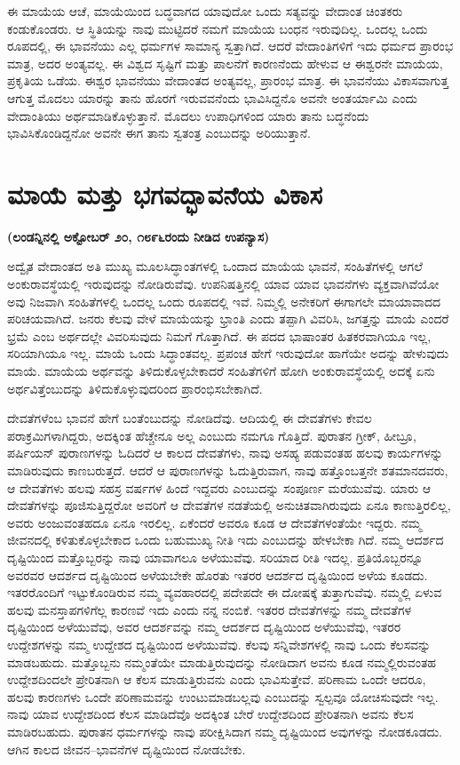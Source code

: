 ಈ ಮಾಯೆಯ ಆಚೆ, ಮಾಯೆಯಿಂದ ಬದ್ಧವಾಗದ ಯಾವುದೋ ಒಂದು ಸತ್ಯವನ್ನು ವೇದಾಂತ ಚಿಂತಕರು ಕಂಡುಕೊಂಡರು. ಆ ಸ್ಥಿತಿಯನ್ನು ನಾವು ಮುಟ್ಟಿದರೆ ನಮಗೆ ಮಾಯೆಯ ಬಂಧನ ಇರುವುದಿಲ್ಲ. ಒಂದಲ್ಲ ಒಂದು ರೂಪದಲ್ಲಿ, ಈ ಭಾವನೆಯು ಎಲ್ಲ ಧರ್ಮಗಳ ಸಾಮಾನ್ಯ ಸ್ವತ್ತಾಗಿದೆ. ಆದರೆ ವೇದಾಂತಿಗಳಿಗೆ ಇದು ಧರ್ಮದ ಪ್ರಾರಂಭ ಮಾತ್ರ, ಅದರ ಅಂತ್ಯವಲ್ಲ. ಈ ವಿಶ್ವದ ಸೃಷ್ಟಿಗೆ ಮತ್ತು ಪಾಲನೆಗೆ ಕಾರಣನೆಂದು ಹೇಳುವ ಆ ಈಶ್ವರನೇ ಮಾಯೆಯ, ಪ್ರಕೃತಿಯ ಒಡೆಯ. ಈಶ್ವರ ಭಾವನೆಯು ವೇದಾಂತದ ಅಂತ್ಯವಲ್ಲ, ಪ್ರಾರಂಭ ಮಾತ್ರ. ಈ ಭಾವನೆಯು ವಿಕಾಸವಾಗುತ್ತ ಆಗುತ್ತ ಮೊದಲು ಯಾರನ್ನು ತಾನು ಹೊರಗೆ ಇರುವವನೆಂದು ಭಾವಿಸಿದ್ದನೊ ಅವನೇ ಅಂತರ್ಯಾಮಿ ಎಂದು ವೇದಾಂತಿಯು ಅರ್ಥಮಾಡಿಕೊಳ್ಳುತ್ತಾನೆ. ಮೊದಲು ಉಪಾಧಿಗಳಿಂದ ಯಾರು ತಾನು ಬದ್ಧನೆಂದು ಭಾವಿಸಿಕೊಂಡಿದ್ದನೋ ಅವನೇ ಈಗ ತಾನು ಸ್ವತಂತ್ರ ಎಂಬುದನ್ನು ಅರಿಯುತ್ತಾನೆ.

\chapter{ಮಾಯೆ ಮತ್ತು ಭಗವದ್ಭಾವನೆಯ ವಿಕಾಸ}

\centerline{\textbf{(ಲಂಡನ್ನಿನಲ್ಲಿ ಅಕ್ಟೋಬರ್​ ೨೦, ೧೮೯೬ರಂದು ನೀಡಿದ ಉಪನ್ಯಾಸ)}}

ಅದ್ವೈತ ವೇದಾಂತದ ಅತಿ ಮುಖ್ಯ ಮೂಲಸಿದ್ಧಾಂತಗಳಲ್ಲಿ ಒಂದಾದ ಮಾಯೆಯ ಭಾವನೆ, ಸಂಹಿತೆಗಳಲ್ಲಿ ಆಗಲೆ ಅಂಕುರಾವಸ್ಥೆಯಲ್ಲಿ ಇರುವುದನ್ನು ನೋಡಿರುವೆವು. ಉಪನಿಷತ್ತಿನಲ್ಲಿ ಯಾವ ಯಾವ ಭಾವನೆಗಳು ವ್ಯಕ್ತವಾಗಿವೆಯೋ ಅವು ನಿಜವಾಗಿ ಸಂಹಿತೆಗಳಲ್ಲಿ ಒಂದಲ್ಲ ಒಂದು ರೂಪದಲ್ಲಿ ಇವೆ. ನಿಮ್ಮಲ್ಲಿ ಅನೇಕರಿಗೆ ಈಗಾಗಲೇ ಮಾಯಾವಾದದ ಪರಿಚಯವಾಗಿದೆ. ಜನರು ಕೆಲವು ವೇಳೆ ಮಾಯೆಯನ್ನು ಭ್ರಾಂತಿ ಎಂದು ತಪ್ಪಾಗಿ ವಿವರಿಸಿ, ಜಗತ್ತನ್ನು ಮಾಯೆ ಎಂದರೆ ಭ್ರಮೆ ಎಂಬ ಅರ್ಥದಲ್ಲೇ ವಿವರಿಸುವುದು ನಿಮಗೆ ಗೊತ್ತಾಗಿದೆ. ಈ ಪದದ ಭಾಷಾಂತರ ಹಿತಕರವಾಗಿಯೂ ಇಲ್ಲ, ಸರಿಯಾಗಿಯೂ ಇಲ್ಲ. ಮಾಯೆ ಒಂದು ಸಿದ್ಧಾಂತವಲ್ಲ. ಪ್ರಪಂಚ ಹೇಗೆ ಇರುವುದೋ ಹಾಗೆಯೇ ಅದನ್ನು ಹೇಳುವುದು ಮಾಯೆ. ಮಾಯೆಯ ಅರ್ಥವನ್ನು ತಿಳಿದುಕೊಳ್ಳಬೇಕಾದರೆ ಸಂಹಿತೆಗಳಿಗೆ ಹೋಗಿ ಅಂಕುರಾವಸ್ಥೆಯಲ್ಲಿ ಅದಕ್ಕೆ ಏನು ಅರ್ಥವಿತ್ತೆಂಬುದನ್ನು ತಿಳಿದುಕೊಳ್ಳುವುದರಿಂದ ಪ್ರಾರಂಭಿಸಬೇಕಾಗಿದೆ.

ದೇವತೆಗಳೆಂಬ ಭಾವನೆ ಹೇಗೆ ಬಂತೆಂಬುದನ್ನು ನೋಡಿದೆವು. ಆದಿಯಲ್ಲಿ ಈ ದೇವತೆಗಳು ಕೇವಲ ಪರಾಕ್ರಮಿಗಳಾಗಿದ್ದರು, ಅದಕ್ಕಿಂತ ಹೆಚ್ಚೇನೂ ಅಲ್ಲ ಎಂಬುದು ನಮಗೂ ಗೊತ್ತಿದೆ. ಪುರಾತನ ಗ್ರೀಕ್​, ಹೀಬ್ರೂ, ಪರ್ಷಿಯನ್​ ಪುರಾಣಗಳನ್ನು ಓದಿದರೆ ಆ ಕಾಲದ ದೇವತೆಗಳು, ನಾವು ಅಸಹ್ಯ ಪಡುವಂತಹ ಹಲವು ಕಾರ್ಯಗಳನ್ನು ಮಾಡಿರುವುದು ಕಾಣಬರುತ್ತದೆ. ಆದರೆ ಆ ಪುರಾಣಗಳನ್ನು ಓದುತ್ತಿರುವಾಗ, ನಾವು ಹತ್ತೊಂಬತ್ತನೇ ಶತಮಾನದವರು, ಆ ದೇವತೆಗಳು ಹಲವು ಸಹಸ್ರ ವರ್ಷಗಳ ಹಿಂದೆ ಇದ್ದವರು ಎಂಬುದನ್ನು ಸಂಪೂರ್ಣ ಮರೆಯುವೆವು. ಯಾರು ಆ ದೇವತೆಗಳನ್ನು ಪೂಜಿಸುತ್ತಿದ್ದರೋ ಅವರಿಗೆ ಆ ದೇವತೆಗಳ ನಡತೆಯಲ್ಲಿ ಅನುಚಿತವಾಗಿರುವುದು ಏನೂ ಕಾಣುತ್ತಿರಲಿಲ್ಲ, ಅವರು ಅಂಜುವಂತಹದೂ ಏನೂ ಇರಲಿಲ್ಲ. ಏಕೆಂದರೆ ಅವರೂ ಕೂಡ ಆ ದೇವತೆಗಳಂತೆಯೇ ಇದ್ದರು. ನಮ್ಮ ಜೀವನದಲ್ಲಿ ಕಳಿತುಕೊಳ್ಳಬೇಕಾದ ಒಂದು ಬಹುಮುಖ್ಯ ನೀತಿ ಇದು ಎಂಬುದನ್ನು ಹೇಳಬೇಕಾ ಗಿದೆ. ನಮ್ಮ ಆದರ್ಶದ ದೃಷ್ಟಿಯಿಂದ ಮತ್ತೊಬ್ಬರನ್ನು ನಾವು ಯಾವಾಗಲೂ ಅಳೆಯುವೆವು. ಸರಿಯಾದ ರೀತಿ ಇದಲ್ಲ. ಪ್ರತಿಯೊಬ್ಬರನ್ನೂ ಅವರವರ ಆದರ್ಶದ ದೃಷ್ಟಿಯಿಂದ ಅಳೆಯಬೇಕೇ ಹೊರತು ಇತರರ ಆದರ್ಶದ ದೃಷ್ಟಿಯಿಂದ ಅಳೆಯ ಕೂಡದು. ಇತರರೊಂದಿಗೆ ಇಟ್ಟುಕೊಂಡಿರುವ ನಮ್ಮ ವ್ಯವಹಾರದಲ್ಲಿ ಪದೇಪದೇ ಈ ದೋಷಕ್ಕೆ ತುತ್ತಾಗುವೆವು. ನಮ್ಮಲ್ಲಿ ಏಳುವ ಹಲವು ಮನಸ್ತಾಪಗಳಿಗೆಲ್ಲ ಕಾರಣವೆ ಇದು ಎಂದು ನನ್ನ ನಂಬಿಕೆ. ಇತರರ ದೇವತೆಗಳನ್ನು ನಮ್ಮ ದೇವತೆಗಳ ದೃಷ್ಟಿಯಿಂದ ಅಳೆಯುವೆವು, ಅವರ ಆದರ್ಶವನ್ನು ನಮ್ಮ ಆದರ್ಶದ ದೃಷ್ಟಿಯಿಂದ ಅಳೆಯುವೆವು, ಇತರರ ಉದ್ದೇಶಗಳನ್ನು ನಮ್ಮ ಉದ್ದೇಶದ ದೃಷ್ಟಿಯಿಂದ ಅಳೆಯುವೆವು. ಕೆಲವು ಸನ್ನಿವೇಶಗಳಲ್ಲಿ ನಾವು ಒಂದು ಕೆಲಸವನ್ನು ಮಾಡಬಹುದು. ಮತ್ತೊಬ್ಬನು ನಮ್ಮಂತೆಯೇ ಮಾಡುತ್ತಿರುವುದನ್ನು ನೋಡಿದಾಗ ಅವನು ಕೂಡ ನಮ್ಮಲ್ಲಿರುವಂತಹ ಉದ್ದೇಶದಿಂದಲೇ ಪ್ರೇರಿತನಾಗಿ ಆ ಕೆಲಸ ಮಾಡುತ್ತಿರುವನು ಎಂದು ಭಾವಿಸುತ್ತೇವೆ. ಪರಿಣಾಮ ಒಂದೇ ಆದರೂ, ಹಲವು ಕಾರಣಗಳು ಒಂದೇ ಪರಿಣಾಮವನ್ನು ಉಂಟುಮಾಡಬಲ್ಲವು ಎಂಬುದನ್ನು ಸ್ವಲ್ಪವೂ ಯೋಚಿಸುವುದೇ ಇಲ್ಲ. ನಾವು ಯಾವ ಉದ್ದೇಶದಿಂದ ಕೆಲಸ ಮಾಡಿದೆವೊ ಅದಕ್ಕಿಂತ ಬೇರೆ ಉದ್ದೇಶದಿಂದ ಪ್ರೇರಿತನಾಗಿ ಅವನು ಕೆಲಸ ಮಾಡಿರಬಹುದು. ಪುರಾತನ ಧರ್ಮಗಳನ್ನು ನಾವು ಪರೀಕ್ಷಿಸಿದಾಗ ನಮ್ಮ ದೃಷ್ಟಿಯಿಂದ ಅವುಗಳನ್ನು ನೋಡಕೂಡದು. ಆಗಿನ ಕಾಲದ ಜೀವನ–ಭಾವನೆಗಳ ದೃಷ್ಟಿಯಿಂದ ನೋಡಬೇಕು.

